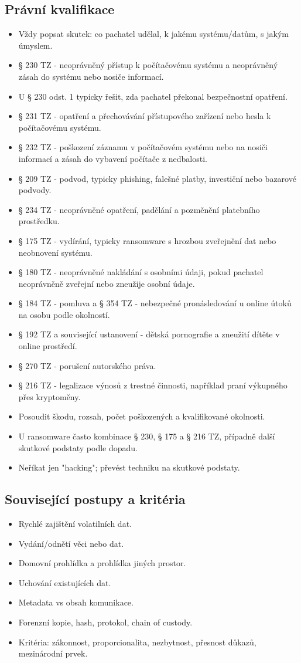 \documentclass[10pt,a4paper]{article}
\newcommand{\blok}[1]{\subsection*{#1}}
\begin{document}
\blok{Právní kvalifikace}
\begin{itemize}
  \item Vždy popsat skutek: co pachatel udělal, k jakému systému/datům, s jakým úmyslem.
  \item § 230 TZ - neoprávněný přístup k počítačovému systému a neoprávněný zásah do systému nebo nosiče informací.
  \item U § 230 odst. 1 typicky řešit, zda pachatel překonal bezpečnostní opatření.
  \item § 231 TZ - opatření a přechovávání přístupového zařízení nebo hesla k počítačovému systému.
  \item § 232 TZ - poškození záznamu v počítačovém systému nebo na nosiči informací a zásah do vybavení počítače z nedbalosti.
  \item § 209 TZ - podvod, typicky phishing, falešné platby, investiční nebo bazarové podvody.
  \item § 234 TZ - neoprávněné opatření, padělání a pozměnění platebního prostředku.
  \item § 175 TZ - vydírání, typicky ransomware s hrozbou zveřejnění dat nebo neobnovení systému.
  \item § 180 TZ - neoprávněné nakládání s osobními údaji, pokud pachatel neoprávněně zveřejní nebo zneužije osobní údaje.
  \item § 184 TZ - pomluva a § 354 TZ - nebezpečné pronásledování u online útoků na osobu podle okolností.
  \item § 192 TZ a související ustanovení - dětská pornografie a zneužití dítěte v online prostředí.
  \item § 270 TZ - porušení autorského práva.
  \item § 216 TZ - legalizace výnosů z trestné činnosti, například praní výkupného přes kryptoměny.
  \item Posoudit škodu, rozsah, počet poškozených a kvalifikované okolnosti.
  \item U ransomware často kombinace § 230, § 175 a § 216 TZ, případně další skutkové podstaty podle dopadu.
  \item Neříkat jen "hacking"; převést techniku na skutkové podstaty.
\end{itemize}

\blok{Související postupy a kritéria}
\begin{itemize}
  \item Rychlé zajištění volatilních dat.
  \item Vydání/odnětí věci nebo dat.
  \item Domovní prohlídka a prohlídka jiných prostor.
  \item Uchování existujících dat.
  \item Metadata vs obsah komunikace.
  \item Forenzní kopie, hash, protokol, chain of custody.
  \item Kritéria: zákonnost, proporcionalita, nezbytnost, přesnost důkazů, mezinárodní prvek.
\end{itemize}
\end{document}
